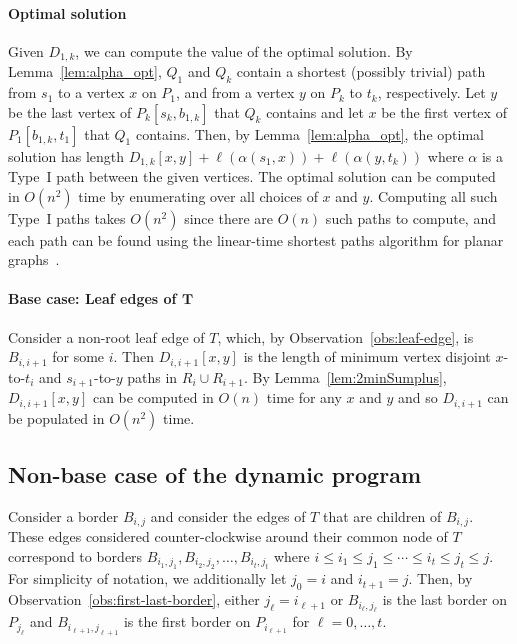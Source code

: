 \documentclass[11pt,twoside]{article}
\newcommand{\spath}[1]{P_{#1}}
\newcommand{\opt}[1]{Q_{#1}}
\newcommand{\region}[1]{R_{#1}}
\newcommand{\border}[2]{B_{#1,#2}}
\newcommand{\len}[1]{\ell(#1)}
\begin{document}
\paragraph{Optimal solution}  Given $D_{1,k}$, we can compute the value of the optimal solution.  By Lemma~\ref{lem:alpha_opt}, $\opt{1}$ and $\opt{k}$ contain a shortest (possibly trivial) path from $s_1$ to a vertex $x$ on $\spath{1}$, and from a vertex $y$ on $\spath{k}$ to $t_k$, respectively.  Let $y$ be the last vertex of $\spath{k}[s_k,b_{1,k}]$ that $\opt{k}$ contains and let $x$ be the first vertex of $P_1[b_{1,k},t_1]$ that $\opt{1}$ contains.  Then, by Lemma~\ref{lem:alpha_opt}, the optimal solution has length $D_{1,k}[x,y] + \len{\alpha(s_1,x)} + \len{\alpha(y,t_k)}$ where $\alpha$ is a Type~I path between the given vertices.  The optimal solution can be computed in $O(n^2)$ time by enumerating over all choices of $x$ and $y$.  Computing all such Type~I paths takes $O(n^2)$ since there are $O(n)$ such paths to compute, and each path can be found using the linear-time shortest paths algorithm for planar graphs~\cite{henzinger1997planarShortestPaths}.

\paragraph{Base case: Leaf edges of $\mathbf T$}  Consider a non-root leaf edge of $T$, which, by Observation~\ref{obs:leaf-edge}, is $B_{i,i+1}$ for some $i$.  Then $D_{i,i+1}[x,y]$ is the length of minimum vertex disjoint $x$-to-$t_i$ and $s_{i+1}$-to-$y$ paths in $\region{i} \cup \region{i+1}$.
By Lemma~\ref{lem:2minSumplus}, $D_{i,i+1}[x,y]$ can be computed in $O(n)$ time  for any $x$ and $y$ and so $D_{i,i+1}$ can be populated in $O(n^2)$ time. 






\subsection{Non-base case of the dynamic program}

Consider a border $\border{i}{j}$ and consider the edges of $T$ that are children of $\border{i}{j}$.  These edges considered counter-clockwise around their common node of $T$ correspond to borders $\border{i_1}{j_1},\border{i_2}{j_2},\ldots,\border{i_t}{j_t}$ where $i \leq i_1 \leq j_1 \leq \cdots \leq i_t \leq j_t \leq j$.  For simplicity of notation, we additionally let $j_0 = i$ and $i_{t+1} = j$.
Then, by Observation~\ref{obs:first-last-border}, either $j_\ell = i_{\ell+1}$ or $\border{i_\ell}{j_\ell}$ is the last border on $\spath{j_\ell}$ and $\border{i_{\ell+1}}{j_{\ell+1}}$ is the first border on $\spath{i_{\ell+1}}$ for $\ell = 0,\ldots,t$.
\end{document}
